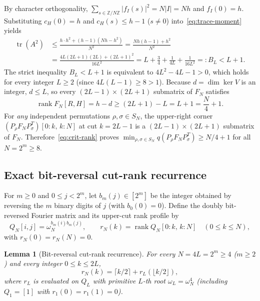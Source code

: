 \documentclass[11pt,reqno]{amsart}
\numberwithin{equation}{section}
\newtheorem{lemma}[theorem]{Lemma}
\theoremstyle{definition}
\theoremstyle{remark}
\newcommand{\Z}{\mathbb{Z}}
\newcommand{\rank}{\operatorname{rank}}
\newcommand{\tr}{\operatorname{tr}}
\begin{document}
By character orthogonality, $\sum_{s\in\Z/N\Z}|f_I(s)|^2 = N|I| = Nh$ and $f_I(0)=h$. Substituting $c_H(0)=h$ and $c_H(s)\le h-1$ ($s\neq 0$) into~\eqref{eq:trace-moment} yields
\begin{equation}
\label{eq:BL-bound}
\begin{aligned}
\tr(A^2)
&\le \frac{h\cdot h^2 + (h-1)(Nh - h^2)}{N^2}
 = \frac{Nh(h-1) + h^2}{N^2}\\
&= \frac{4L(2L+1)(2L) + (2L+1)^2}{16L^2}
 = L + \frac{3}{4} + \frac{1}{4L} + \frac{1}{16L^2} =: B_L < L + 1.
\end{aligned}
\end{equation}
The strict inequality $B_L < L+1$ is equivalent to $4L^2 - 4L - 1 > 0$, which holds for every integer $L\ge 2$ (since $4L(L-1) \ge 8 > 1$). Because $d=\dim\ker V$ is an integer, $d\le L$, so every $(2L-1)\times(2L+1)$ submatrix of $F_N$ satisfies
\begin{equation}
\label{eq:crit-rank}
\rank F_N[R,H] = h - d \ge (2L+1) - L = L + 1 = \frac{N}{4} + 1.
\end{equation}
For \emph{any} independent permutations $\rho,\sigma\in S_N$, the upper-right corner $(P_\rho F_N P_\sigma^T)[0{:}k,\,k{:}N]$ at cut $k = 2L-1$ is a $(2L-1)\times(2L+1)$ submatrix of $F_N$. Therefore~\eqref{eq:crit-rank} proves $\min_{\rho,\sigma\in S_N} q(P_\rho F_N P_\sigma^T) \ge N/4 + 1$ for all $N=2^m\ge 8$.

\subsection{Exact bit-reversal cut-rank recurrence}

For $m\ge 0$ and $0\le j < 2^m$, let $b_m(j)\in[2^m]$ be the integer obtained by reversing the $m$ binary digits of $j$ (with $b_0(0)=0$). Define the doubly bit-reversed Fourier matrix and its upper-cut rank profile by
\[
Q_N[i,j] = \omega_N^{b_m(i)b_m(j)},\qquad
r_N(k) = \rank Q_N[0{:}k,\, k{:}N]\quad (0\le k\le N),
\]
with $r_N(0)=r_N(N)=0$.

\begin{lemma}[Bit-reversal cut-rank recurrence]
\label{lem:bitrev-rec}
For every $N=4L=2^m\ge 4$ ($m\ge 2$) and every integer $0\le k\le 2L$,
\begin{equation}
\label{eq:bitrev-rec}
r_N(k) = \lceil k/2\rceil + r_L(\lfloor k/2\rfloor),
\end{equation}
where $r_L$ is evaluated on $Q_L$ with primitive $L$-th root $\omega_L = \omega_N^4$ (including $Q_1=[1]$ with $r_1(0)=r_1(1)=0$).
\end{lemma}
\end{document}
